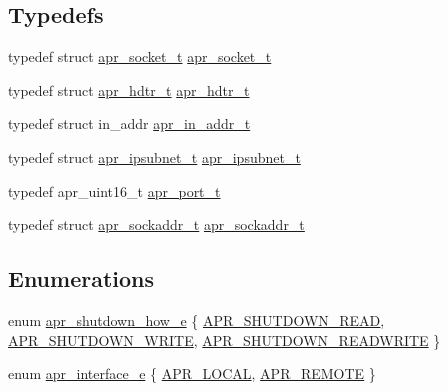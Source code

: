 \subsection*{Typedefs}
\begin{DoxyCompactItemize}
\item 
typedef struct \hyperlink{group__apr__network__io_ga49262b223e7434746e1f1737659aa2c3}{apr\-\_\-socket\-\_\-t} \hyperlink{group__apr__network__io_ga49262b223e7434746e1f1737659aa2c3}{apr\-\_\-socket\-\_\-t}
\item 
typedef struct \hyperlink{structapr__hdtr__t}{apr\-\_\-hdtr\-\_\-t} \hyperlink{group__apr__network__io_ga97887d5358a9c79c241ccafab61d8ff5}{apr\-\_\-hdtr\-\_\-t}
\item 
typedef struct in\-\_\-addr \hyperlink{group__apr__network__io_gad30d6c55a354a9a2e0a8747abb0c8176}{apr\-\_\-in\-\_\-addr\-\_\-t}
\item 
typedef struct \hyperlink{group__apr__network__io_gac86ee04eb80f938902095d1d0a67c324}{apr\-\_\-ipsubnet\-\_\-t} \hyperlink{group__apr__network__io_gac86ee04eb80f938902095d1d0a67c324}{apr\-\_\-ipsubnet\-\_\-t}
\item 
typedef apr\-\_\-uint16\-\_\-t \hyperlink{group__apr__network__io_gaa670a71960f6eb4fe0d0de2a1e7aba03}{apr\-\_\-port\-\_\-t}
\item 
typedef struct \hyperlink{structapr__sockaddr__t}{apr\-\_\-sockaddr\-\_\-t} \hyperlink{group__apr__network__io_ga373fb6f32d0875c5deb648b779c8a709}{apr\-\_\-sockaddr\-\_\-t}
\end{DoxyCompactItemize}
\subsection*{Enumerations}
\begin{DoxyCompactItemize}
\item 
enum \hyperlink{group__apr__network__io_gae2130f1fa2d0db58c5c3c9c73d9b4009}{apr\-\_\-shutdown\-\_\-how\-\_\-e} \{ \hyperlink{group__apr__network__io_ggae2130f1fa2d0db58c5c3c9c73d9b4009a88d0661d35eea5319715d6ca69265b01}{A\-P\-R\-\_\-\-S\-H\-U\-T\-D\-O\-W\-N\-\_\-\-R\-E\-A\-D}, 
\hyperlink{group__apr__network__io_ggae2130f1fa2d0db58c5c3c9c73d9b4009a5e335b392088e14df65d1bd5e0db7c46}{A\-P\-R\-\_\-\-S\-H\-U\-T\-D\-O\-W\-N\-\_\-\-W\-R\-I\-T\-E}, 
\hyperlink{group__apr__network__io_ggae2130f1fa2d0db58c5c3c9c73d9b4009add172f55ff5ee7b930683a3903c99768}{A\-P\-R\-\_\-\-S\-H\-U\-T\-D\-O\-W\-N\-\_\-\-R\-E\-A\-D\-W\-R\-I\-T\-E}
 \}
\item 
enum \hyperlink{group__apr__network__io_ga1982f44f48fdf00a8bd754bc7b773edc}{apr\-\_\-interface\-\_\-e} \{ \hyperlink{group__apr__network__io_gga1982f44f48fdf00a8bd754bc7b773edca6c23a4bf48b8f93dff08adf827382616}{A\-P\-R\-\_\-\-L\-O\-C\-A\-L}, 
\hyperlink{group__apr__network__io_gga1982f44f48fdf00a8bd754bc7b773edcaeb8be70b031f06a513ac0ebcaa5bac8a}{A\-P\-R\-\_\-\-R\-E\-M\-O\-T\-E}
 \}
\end{DoxyCompactItemize}
